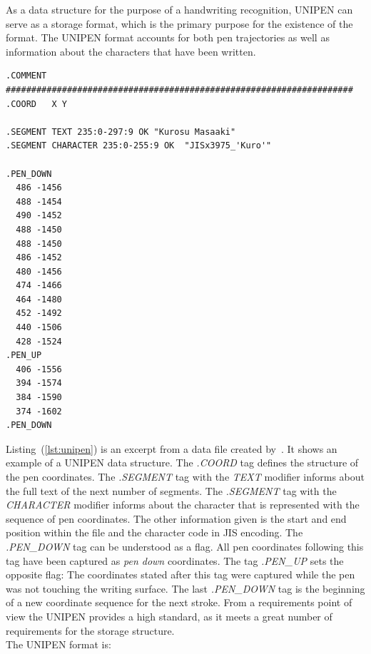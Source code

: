 As a data structure for the purpose of a handwriting recognition, UNIPEN can 
serve as a storage format, which is the primary purpose for the existence of the
format. The UNIPEN format accounts for both pen trajectories as well as 
information about the characters that have been written.
\begin{xmlcode}
  \begin{lstlisting}[emph={COMMENT,COORD,SEGMENT},emphstyle=\textbf,caption={Demonstration of the \emph{UNIPEN} format},label=lst:unipen]
.COMMENT #################################################################### 
.COORD   X Y

.SEGMENT TEXT 235:0-297:9 OK "Kurosu Masaaki"
.SEGMENT CHARACTER 235:0-255:9 OK  "JISx3975_'Kuro'"

.PEN_DOWN 
  486 -1456 
  488 -1454 
  490 -1452 
  488 -1450 
  488 -1450 
  486 -1452 
  480 -1456 
  474 -1466 
  464 -1480 
  452 -1492 
  440 -1506 
  428 -1524
.PEN_UP 
  406 -1556 
  394 -1574 
  384 -1590 
  374 -1602
.PEN_DOWN 
  \end{lstlisting}
\end{xmlcode}
Listing~(\ref{lst:unipen}) is an excerpt from a data file created 
by~. It shows an example of a UNIPEN data structure.
The \emph{.COORD} tag defines the structure of the pen coordinates. 
The \emph{.SEGMENT} tag with the \emph{TEXT} modifier informs about the
full text of the next number of segments. The \emph{.SEGMENT} tag with the
\emph{CHARACTER} modifier informs about the character that is represented
with the sequence of pen coordinates. The other information given is the
start and end position within the file and the character code in JIS encoding.
The \emph{.PEN\_DOWN} tag can be understood as a flag. All pen coordinates 
following this tag have been captured as \emph{pen down} coordinates.
The tag \emph{.PEN\_UP} sets the opposite flag: The coordinates stated after 
this tag were captured while the pen was not touching the writing surface.
The last \emph{.PEN\_DOWN} tag is the beginning of a new coordinate sequence
for the next stroke. From a requirements point of view the UNIPEN provides a
high standard, as it meets a great number of requirements for the storage 
structure. \\
The UNIPEN format is:
